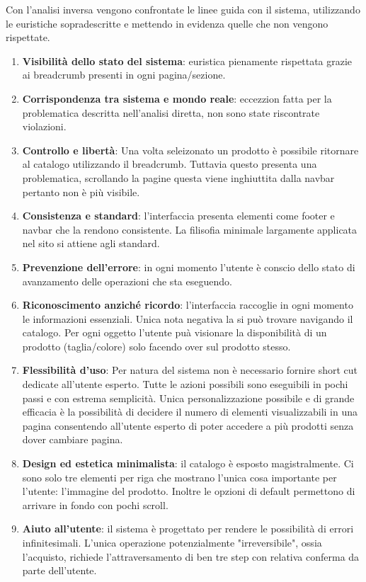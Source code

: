 \documentclass[12pt,italian,]{report}
\providecommand{\tightlist}{%
  \setlength{\itemsep}{0pt}\setlength{\parskip}{0pt}}
\begin{document}
Con l'analisi inversa vengono confrontate le linee guida con il sistema, utilizzando le euristiche sopradescritte e mettendo in evidenza quelle che non vengono rispettate.
\begin{enumerate}
\def\labelenumi{\arabic{enumi}.}
\tightlist
\item
  \textbf{Visibilità dello stato del sistema}: euristica pienamente rispettata grazie ai breadcrumb presenti in ogni pagina/sezione.
\item
  \textbf{Corrispondenza tra sistema e mondo reale}: eccezzion fatta per la problematica descritta nell'analisi diretta, non sono state riscontrate violazioni.
\item
  \textbf{Controllo e libertà}: Una volta seleizonato un prodotto è possibile ritornare al catalogo utilizzando il breadcrumb. Tuttavia questo presenta una problematica, scrollando la pagine questa viene inghiuttita dalla navbar pertanto non è più visibile.
\item
  \textbf{Consistenza e standard}: l'interfaccia presenta elementi come footer e navbar che la rendono consistente. La filisofia minimale largamente applicata nel sito si attiene agli standard.
\item
  \textbf{Prevenzione dell'errore}: in ogni momento l'utente è conscio dello stato di avanzamento delle operazioni che sta eseguendo. 
\item
  \textbf{Riconoscimento anziché ricordo}: l'interfaccia raccoglie in ogni momento le informazioni essenziali. Unica nota negativa la si può trovare navigando il catalogo. Per ogni oggetto l'utente puà visionare la disponibilità di un prodotto (taglia/colore) solo facendo over sul prodotto stesso.
\item
  \textbf{Flessibilità d'uso}: Per natura del sistema non è necessario fornire short cut dedicate all'utente esperto. Tutte le azioni possibili sono eseguibili in pochi passi e con estrema semplicità. Unica personalizzazione possibile e di grande efficacia è la possibilità di decidere il numero di elementi visualizzabili in una pagina consentendo all'utente esperto di poter accedere a più prodotti senza dover cambiare pagina.
\item
  \textbf{Design ed estetica minimalista}: il catalogo è esposto magistralmente. Ci sono solo tre elementi per riga che mostrano l'unica cosa importante per l'utente: l'immagine del prodotto. Inoltre le opzioni di default permettono di arrivare in fondo con pochi scroll. 
\item
  \textbf{Aiuto all'utente}: il sistema è progettato per rendere le possibilità di errori infinitesimali. L'unica operazione potenzialmente "irreversibile", ossia l'acquisto, richiede l'attraversamento di ben tre step con relativa conferma da parte dell'utente. 

\end{enumerate}
\end{document}
